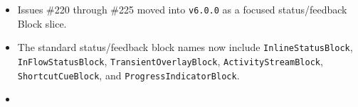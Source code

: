 \begin{itemize}
\tightlist
\item
  Issues \#220 through \#225 moved into \texttt{v\allowbreak{}6\allowbreak{}.\allowbreak{}0\allowbreak{}.\allowbreak{}0} as a focused status/feedback Block slice.
\item
  The standard status/feedback block names now include \texttt{I\allowbreak{}n\allowbreak{}l\allowbreak{}i\allowbreak{}n\allowbreak{}e\allowbreak{}S\allowbreak{}t\allowbreak{}a\allowbreak{}t\allowbreak{}u\allowbreak{}s\allowbreak{}B\allowbreak{}l\allowbreak{}o\allowbreak{}c\allowbreak{}k}, \texttt{I\allowbreak{}n\allowbreak{}F\allowbreak{}l\allowbreak{}o\allowbreak{}w\allowbreak{}S\allowbreak{}t\allowbreak{}a\allowbreak{}t\allowbreak{}u\allowbreak{}s\allowbreak{}B\allowbreak{}l\allowbreak{}o\allowbreak{}c\allowbreak{}k}, \texttt{T\allowbreak{}r\allowbreak{}a\allowbreak{}n\allowbreak{}s\allowbreak{}i\allowbreak{}e\allowbreak{}n\allowbreak{}t\allowbreak{}O\allowbreak{}v\allowbreak{}e\allowbreak{}r\allowbreak{}l\allowbreak{}a\allowbreak{}y\allowbreak{}B\allowbreak{}l\allowbreak{}o\allowbreak{}c\allowbreak{}k}, \texttt{A\allowbreak{}c\allowbreak{}t\allowbreak{}i\allowbreak{}v\allowbreak{}i\allowbreak{}t\allowbreak{}y\allowbreak{}S\allowbreak{}t\allowbreak{}r\allowbreak{}e\allowbreak{}a\allowbreak{}m\allowbreak{}B\allowbreak{}l\allowbreak{}o\allowbreak{}c\allowbreak{}k}, \texttt{S\allowbreak{}h\allowbreak{}o\allowbreak{}r\allowbreak{}t\allowbreak{}c\allowbreak{}u\allowbreak{}t\allowbreak{}C\allowbreak{}u\allowbreak{}e\allowbreak{}B\allowbreak{}l\allowbreak{}o\allowbreak{}c\allowbreak{}k}, and \texttt{P\allowbreak{}r\allowbreak{}o\allowbreak{}g\allowbreak{}r\allowbreak{}e\allowbreak{}s\allowbreak{}s\allowbreak{}I\allowbreak{}n\allowbreak{}d\allowbreak{}i\allowbreak{}c\allowbreak{}a\allowbreak{}t\allowbreak{}o\allowbreak{}r\allowbreak{}B\allowbreak{}l\allowbreak{}o\allowbreak{}c\allowbreak{}k}.
\item

\end{itemize}
